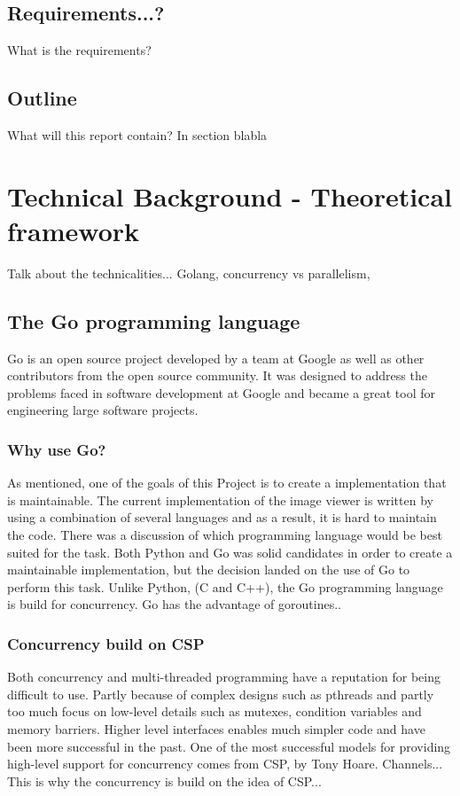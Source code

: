 \documentclass[12pt, a4paper, oneside]{article}
\begin{document}
\subsection{Requirements...?}
What is the requirements?

\subsection{Outline}
What will this report contain?
In section blabla



\section{Technical Background - Theoretical framework}
Talk about the technicalities... Golang, concurrency vs parallelism,
\subsection{The Go programming language}
Go is an open source project developed by a team at Google as well as other contributors from the open source community. It was designed to address the problems faced in software development at Google and became a great tool for engineering large software projects.

\subsubsection{Why use Go?}
As mentioned, one of the goals of this Project is to create a implementation that is maintainable. The current implementation of the image viewer is written by using a combination of several languages and as a result, it is hard to maintain the code. 
There was a discussion of which programming language would be best suited for the task. Both Python and Go was solid candidates in order to create a maintainable implementation, but the decision landed on the use of Go to perform this task.
Unlike Python, (C and C++), the Go programming language is build for concurrency. 
Go has the advantage of goroutines..

\subsubsection{Concurrency build on CSP}
Both concurrency and multi-threaded programming have a reputation for being difficult to use. Partly because of complex designs such as pthreads and partly too much focus on low-level details such as mutexes, condition variables and memory barriers. Higher level interfaces enables much simpler code and have been more successful in the past. One of the most successful models for providing high-level support for concurrency comes from CSP, by Tony Hoare. 
Channels... 
This is why the concurrency is build on the idea of CSP...
\end{document}
